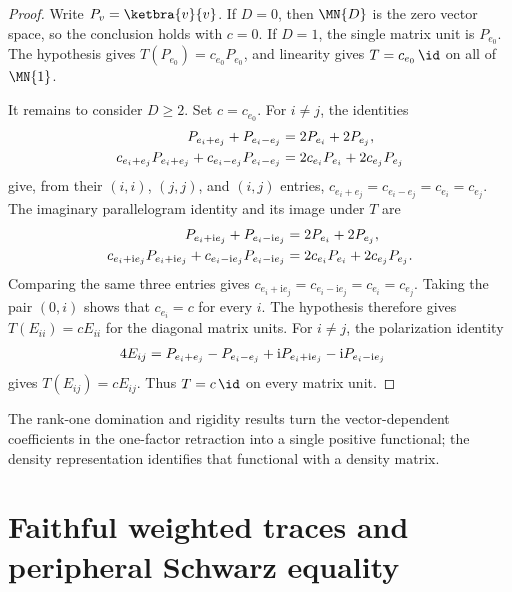 \begin{proof}
    \leanok
    Write $P_v=\ketbra{v}{v}$. If $D=0$, then $\MN{D}$ is the zero vector
    space, so the conclusion holds with $c=0$. If $D=1$, the single matrix unit
    is $P_{e_0}$. The hypothesis gives $T(P_{e_0})=c_{e_0}P_{e_0}$, and
    linearity gives $T=c_{e_0}\,\id$ on all of $\MN{1}$.

    It remains to consider $D\geq2$. Set $c=c_{e_0}$. For $i\ne j$, the identities
    \begin{align}
        P_{e_i+e_j}+P_{e_i-e_j}
         & =2P_{e_i}+2P_{e_j},
        \notag                              \\
        c_{e_i+e_j}P_{e_i+e_j}+c_{e_i-e_j}P_{e_i-e_j}
         & =2c_{e_i}P_{e_i}+2c_{e_j}P_{e_j}
        \notag
    \end{align}
    give, from their $(i,i)$, $(j,j)$, and $(i,j)$ entries,
    $c_{e_i+e_j}=c_{e_i-e_j}=c_{e_i}=c_{e_j}$.
    The imaginary parallelogram identity and its image under $T$ are
    \begin{align}
        P_{e_i+\mathrm{i}e_j}+P_{e_i-\mathrm{i}e_j}
         & =2P_{e_i}+2P_{e_j},
        \notag                               \\
        c_{e_i+\mathrm{i}e_j}P_{e_i+\mathrm{i}e_j}
        +c_{e_i-\mathrm{i}e_j}P_{e_i-\mathrm{i}e_j}
         & =2c_{e_i}P_{e_i}+2c_{e_j}P_{e_j}.
        \notag
    \end{align}
    Comparing the same three entries gives
    $c_{e_i+\mathrm{i}e_j}=c_{e_i-\mathrm{i}e_j}=c_{e_i}=c_{e_j}$.
    Taking the pair $(0,i)$ shows that $c_{e_i}=c$ for every $i$.
    The hypothesis therefore gives $T(E_{ii})=cE_{ii}$ for the diagonal matrix
    units. For $i\ne j$, the polarization identity
    \begin{align}
        4E_{ij}
         & =P_{e_i+e_j}-P_{e_i-e_j}
        +\mathrm{i}P_{e_i+\mathrm{i}e_j}
        -\mathrm{i}P_{e_i-\mathrm{i}e_j}
        \notag
    \end{align}
    gives $T(E_{ij})=cE_{ij}$. Thus $T=c\,\id$ on every matrix unit.
\end{proof}

The rank-one domination and rigidity results turn the vector-dependent
coefficients in the one-factor retraction into a single positive functional;
the density representation identifies that functional with a density matrix.

\section{Faithful weighted traces and peripheral Schwarz equality}
\label{sec:app_schwarz_weighted_ks}

